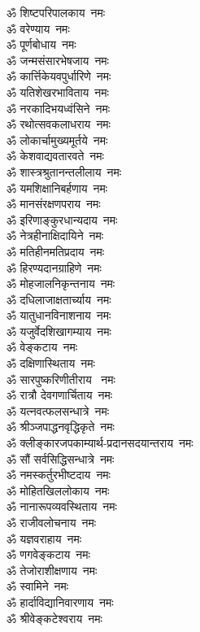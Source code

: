\begin{multicols}{2}
\begin{flushleft}
        ॐ शिष्टपरिपालकाय~नमः\\
        ॐ वरेण्याय~नमः\\
        ॐ पूर्णबोधाय~नमः\\
        ॐ जन्मसंसारभेषजाय~नमः\\
        ॐ कार्त्तिकेयवपुर्धारिणे~नमः\\
        ॐ यतिशेखरभाविताय~नमः\\
        ॐ नरकादिभयध्वंसिने~नमः\\
        ॐ रथोत्सवकलाधराय~नमः\\
        ॐ लोकार्चामुख्यमूर्तये~नमः\\
        ॐ केशवाद्यवतारवते~नमः\hfill{}\\
                                                        
        ॐ शास्त्रश्रुतानन्तलीलाय~नमः\\
        ॐ यमशिक्षानिबर्हणाय~नमः\\
        ॐ मानसंरक्षणपराय~नमः\\
        ॐ इरिणाङ्कुरधान्यदाय~नमः\\
        ॐ नेत्रहीनाक्षिदायिने~नमः\\
        ॐ मतिहीनमतिप्रदाय~नमः\\
        ॐ हिरण्यदानग्राहिणे~नमः\\
        ॐ मोहजालनिकृन्तनाय~नमः\\
        ॐ दधिलाजाक्षतार्च्याय~नमः\\
        ॐ यातुधानविनाशनाय~नमः\hfill{}\\
                                                        
        ॐ यजुर्वेदशिखागम्याय~नमः\\
        ॐ वेङ्कटाय~नमः\\
        ॐ दक्षिणास्थिताय~नमः\\
        ॐ सारपुष्करिणीतीराय ~नमः\\
        ॐ रात्रौ  देवगणार्चिताय~नमः\\
        ॐ यत्नवत्फलसन्धात्रे~नमः\\
        ॐ श्रीञ्जपाद्धनवृद्धिकृते~नमः\\
        ॐ क्लीङ्कारजपकाम्यार्थ-प्रदानसदयान्तराय~नमः\\
        ॐ सौं सर्वसिद्धिसन्धात्रे~नमः\\
        ॐ नमस्कर्तुरभीष्टदाय~नमः\hfill{}\\
        
        ॐ मोहितखिललोकाय~नमः\\
        ॐ नानारूपव्यवस्थिताय~नमः\\
        ॐ राजीवलोचनाय~नमः\\
        ॐ यज्ञवराहाय~नमः\\
        ॐ णगवेङ्कटाय~नमः\\
        ॐ तेजोराशीक्षणाय~नमः\\
        ॐ स्वामिने~नमः\\
        ॐ हार्दाविद्यानिवारणाय~नमः\hfill{}\\
        ॐ श्रीवेङ्कटेश्वराय~नमः\\
    \end{flushleft}
\end{multicols}

